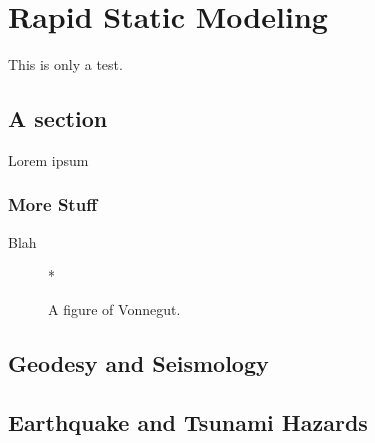 
\chapter{Rapid Static Modeling}
This is only a test.
\section{A section}
Lorem ipsum
\subsection{More Stuff}
Blah

\begin{figure}[h] 
  \centering
  *
  \caption{A figure of Vonnegut.} 
\end{figure}

\section{Geodesy and Seismology}

\section{Earthquake and Tsunami Hazards}



